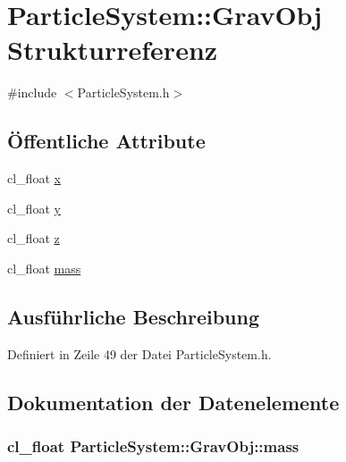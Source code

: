 \hypertarget{structParticleSystem_1_1GravObj}{\section{Particle\-System\-:\-:Grav\-Obj Strukturreferenz}
\label{structParticleSystem_1_1GravObj}
}


{\ttfamily \#include $<$Particle\-System.\-h$>$}

\subsection*{Öffentliche Attribute}
\begin{DoxyCompactItemize}
\item 
cl\-\_\-float \hyperlink{structParticleSystem_1_1GravObj_af8b40c8baac8ffc87c2ff94da520e6e6}{x}
\item 
cl\-\_\-float \hyperlink{structParticleSystem_1_1GravObj_a61f790d3ed600fe93af533abee250297}{y}
\item 
cl\-\_\-float \hyperlink{structParticleSystem_1_1GravObj_aa8d66d46d2ec63bbdcc8b451e2283278}{z}
\item 
cl\-\_\-float \hyperlink{structParticleSystem_1_1GravObj_adbf1a8e24d75b5826eea902b063bcb1c}{mass}
\end{DoxyCompactItemize}


\subsection{Ausführliche Beschreibung}


Definiert in Zeile 49 der Datei Particle\-System.\-h.



\subsection{Dokumentation der Datenelemente}
\hypertarget{structParticleSystem_1_1GravObj_adbf1a8e24d75b5826eea902b063bcb1c}{
\subsubsection[{mass}]{\setlength{\rightskip}{0pt plus 5cm}cl\-\_\-float Particle\-System\-::\-Grav\-Obj\-::mass}}\label{structParticleSystem_1_1GravObj_adbf1a8e24d75b5826eea902b063bcb1c}


